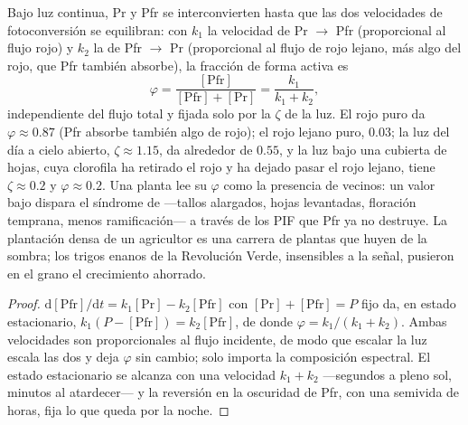 \begin{proposition}\label{prop:b3:plant-molecular-physiology:photoequilibrium}
Bajo luz continua, Pr y Pfr se interconvierten hasta que las dos
velocidades de fotoconversión se equilibran: con $k_{1}$ la velocidad
de Pr $\to$ Pfr (proporcional al flujo rojo) y $k_{2}$ la de Pfr $\to$
Pr (proporcional al flujo de rojo lejano, más algo del rojo, que Pfr
también absorbe), la fracción de forma activa es
\[
\varphi = \frac{[\text{Pfr}]}{[\text{Pfr}] + [\text{Pr}]} = \frac{k_{1}}{k_{1} + k_{2}},
\]
independiente del flujo total y fijada solo por la \emph{} $\zeta$ de la luz. El rojo puro da
$\varphi \approx 0.87$ (Pfr absorbe también algo de rojo); el rojo
lejano puro, $0.03$; la luz del día a cielo abierto, $\zeta \approx
1.15$, da alrededor de $0.55$, y la luz bajo una cubierta de hojas,
cuya clorofila ha retirado el rojo y ha dejado pasar el rojo lejano,
tiene $\zeta \approx 0.2$ y $\varphi \approx 0.2$. Una planta lee su
$\varphi$ como la presencia de vecinos: un valor bajo dispara el
síndrome de \emph{} ---tallos alargados, hojas
levantadas, floración temprana, menos ramificación--- a través de los
PIF que Pfr ya no destruye. La plantación densa de un agricultor es una
carrera de plantas que huyen de la sombra; los trigos enanos de la
Revolución Verde, insensibles a la señal, pusieron en el grano el
crecimiento ahorrado.
\end{proposition}
\begin{proof}
$\mathrm{d}[\text{Pfr}]/\mathrm{d}t = k_{1}[\text{Pr}] - k_{2}[\text{Pfr}]$
con $[\text{Pr}] + [\text{Pfr}] = P$ fijo da, en estado estacionario,
$k_{1}(P - [\text{Pfr}]) = k_{2}[\text{Pfr}]$, de donde $\varphi = k_{1}/
(k_{1} + k_{2})$. Ambas velocidades son proporcionales al flujo
incidente, de modo que escalar la luz escala las dos y deja $\varphi$
sin cambio; solo importa la composición espectral. El estado
estacionario se alcanza con una velocidad $k_{1} + k_{2}$ ---segundos a
pleno sol, minutos al atardecer--- y la reversión en la oscuridad de
Pfr, con una semivida de horas, fija lo que queda por la noche.
\end{proof}

